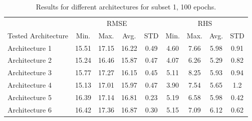 \documentclass[12pt]{IEEEtran}%
\begin{document}
\begin{table}
\begin{center}
\caption{Results for different architectures for subset 1, 100 epochs.}%
%

\begin{tabular}
[c]{l|cccc|cccc}\hline
& \multicolumn{4}{|c}{RMSE} & \multicolumn{4}{|c}{RHS}\\
Tested Architecture & Min. & Max. & Avg. & STD & Min. & Max. & Avg. &
STD\\\hline\hline
Architecture 1 & 15.51 & 17.15 & 16.22 & 0.49 & 4.60 & 7.66 & 5.98 & 0.91\\
Architecture 2 & 15.24 & 16.46 & 15.87 & 0.47 & 4.07 & 6.26 & 5.29 & 0.82\\
Architecture 3 & 15.77 & 17.27 & 16.15 & 0.45 & 5.11 & 8.25 & 5.93 & 0.94\\
Architecture 4 & 15.13 & 17.01 & 15.97 & 0.47 & 3.90 & 7.54 & 5.65 & 1.2\\
Architecture 5 & 16.39 & 17.14 & 16.81 & 0.23 & 5.19 & 6.58 & 5.98 & 0.42\\
Architecture 6 & 16.42 & 17.36 & 16.87 & 0.30 & 5.15 & 7.09 & 6.12 &
0.62\\\hline
\end{tabular}
\label{table:tested_architectures_100}%

\end{center}
\end{table}%
%
\end{document}
